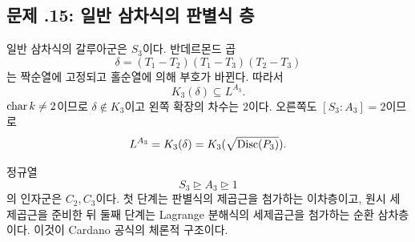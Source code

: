 \subsection*{문제 \thechapter.15: 일반 삼차식의 판별식 층}

\begin{solution}
일반 삼차식의 갈루아군은 $S_3$이다. 반데르몬드 곱
\[
  \delta=(T_1-T_2)(T_1-T_3)(T_2-T_3)
\]
는 짝순열에 고정되고 홀순열에 의해 부호가 바뀐다. 따라서
\[
  K_3(\delta)\subseteq L^{A_3}.
\]
$\operatorname{char} k\ne2$이므로 $\delta\notin K_3$이고 왼쪽 확장의 차수는 $2$이다. 오른쪽도 $[S_3:A_3]=2$이므로
\[
  L^{A_3}=K_3(\delta)
  =K_3(\sqrt{\operatorname{Disc}(P_3)}).
\]

정규열
\[
  S_3\trianglerighteq A_3\trianglerighteq1
\]
의 인자군은 $C_2,C_3$이다. 첫 단계는 판별식의 제곱근을 첨가하는 이차층이고, 원시 세제곱근을 준비한 뒤 둘째 단계는 Lagrange 분해식의 세제곱근을 첨가하는 순환 삼차층이다. 이것이 Cardano 공식의 체론적 구조이다.
\end{solution}
